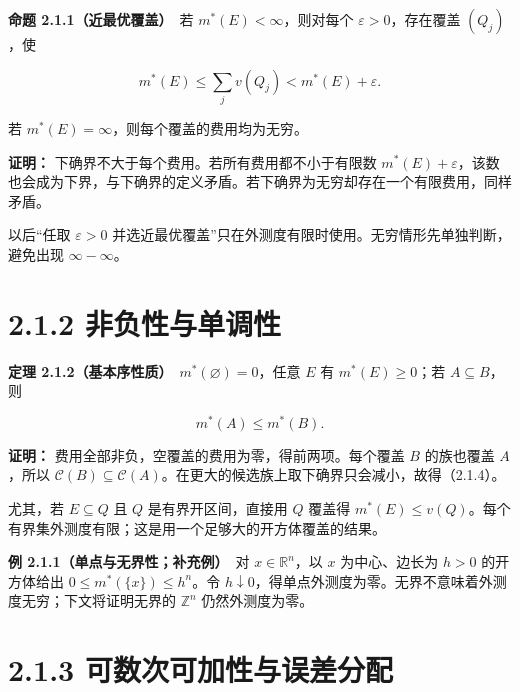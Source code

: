 \documentclass[11pt,a4paper]{article}
\begin{document}
\textbf{命题 2.1.1（近最优覆盖）}　若 \(m^*(E)<\infty\)，则对每个
\(\varepsilon>0\)，存在覆盖 \((Q_j)\)，使

\begin{equation*}
m^*(E)\le\sum_jv(Q_j)<m^*(E)+\varepsilon.
\tag{2.1.3}
\end{equation*}

若 \(m^*(E)=\infty\)，则每个覆盖的费用均为无穷。

\textbf{证明：} 下确界不大于每个费用。若所有费用都不小于有限数
\(m^*(E)+\varepsilon\)，该数也会成为下界，与下确界的定义矛盾。若下确界为无穷却存在一个有限费用，同样矛盾。

以后``任取 \(\varepsilon>0\)
并选近最优覆盖''只在外测度有限时使用。无穷情形先单独判断，避免出现
\(\infty-\infty\)。

\section[\S{}2.1.2
非负性与单调性]{2.1.2
非负性与单调性}\label{ux975eux8d1fux6027ux4e0eux5355ux8c03ux6027}

\textbf{定理 2.1.2（基本序性质）}　\(m^*(\varnothing)=0\)，任意 \(E\) 有
\(m^*(E)\ge0\)；若 \(A\subseteq B\)，则

\begin{equation*}
m^*(A)\le m^*(B).
\tag{2.1.4}
\end{equation*}

\textbf{证明：} 费用全部非负，空覆盖的费用为零，得前两项。每个覆盖 \(B\)
的族也覆盖 \(A\)，所以
\(\mathcal C(B)\subseteq\mathcal C(A)\)。在更大的候选族上取下确界只会减小，故得（2.1.4）。

尤其，若 \(E\subseteq Q\) 且 \(Q\) 是有界开区间，直接用 \(Q\) 覆盖得
\(m^*(E)\le v(Q)\)。每个有界集外测度有限；这是用一个足够大的开方体覆盖的结果。

\textbf{例 2.1.1（单点与无界性；补充例）}　对 \(x\in\mathbb R^n\)，以
\(x\) 为中心、边长为 \(h>0\) 的开方体给出 \(0\le m^*(\{x\})\le h^n\)。令
\(h\downarrow0\)，得单点外测度为零。无界不意味着外测度无穷；下文将证明无界的
\(\mathbb Z^n\) 仍然外测度为零。

\section[\S{}2.1.3
可数次可加性与误差分配]{2.1.3
可数次可加性与误差分配}\label{ux53efux6570ux6b21ux53efux52a0ux6027ux4e0eux8befux5deeux5206ux914d}
\end{document}
